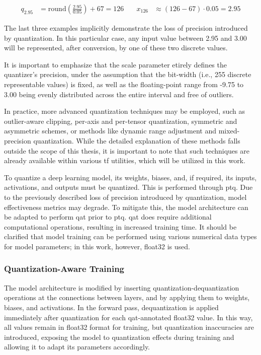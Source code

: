 {\begin{align*}
q_{2.95} &= \text{round}\left(\frac{2.95}{0.05} \right) + 67 = 126
& \quad
x_{126} &\approx \left( 126 - 67 \right) \cdot 0.05 = 2.95
\end{align*}

The last three examples implicitly demonstrate the loss of precision introduced by quantization.
In this particular case, any input value between 2.95 and 3.00 will be represented, after conversion, by one of these two discrete values.

It is important to emphasize that the scale parameter etirely defines the quantizer's precision,
under the assumption that the bit-width (i.e., 255 discrete representable values) is fixed,
as well as the floating-point range from -9.75 to 3.00 being evenly distributed across the entire interval and free of outliers.

In practice, more advanced quantization techniques may be employed, such as outlier-aware clipping, per-axis and per-tensor quantization,
symmetric and asymmetric schemes, or methods like dynamic range adjustment and mixed-precision quantization.
While the detailed explanation of these methods falls outside the scope of this thesis,
it is important to note that such techniques are already available within various \gls{tf} utilities, which will be utilized in this work.

To quantize a deep learning model, its weights, biases, and, if required, its inputs, activations, and outputs must be quantized. This is performed through \gls{ptq}.
Due to the previously described loss of precision introduced by quantization, model effectiveness metrics may degrade.
To mitigate this, the model architecture can be adapted to perform \gls{qat} prior to \gls{ptq}.
\gls{qat} does require additional computational operations, resulting in increased training time.
It should be clarified that model training can be performed using various numerical data types for model parameters; in this work, however, \gls{float32} is used.

\subsubsection{Quantization-Aware Training}
\label{subsubsec:qat}

The model architecture is modified by inserting quantization-dequantization operations at the connections between layers,
and by applying them to weights, biases, and activations.
In the forward pass, dequantization is applied immediately after quantization for each \gls{qat}-annotated \gls{float32} value.
In this way, all values remain in \gls{float32} format for training,
but quantization inaccuracies are introduced, exposing the model to quantization effects during training and allowing it to adapt its parameters accordingly.

}
